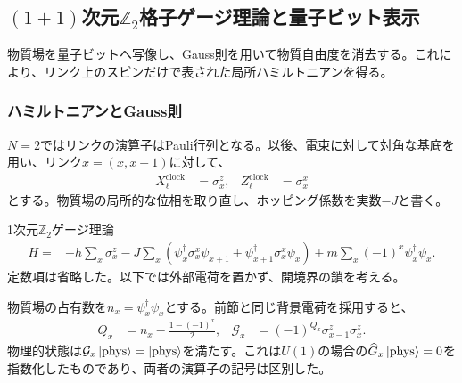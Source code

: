 \documentclass[a4paper,10.5pt]{article}
\numberwithin{equation}{section}
\begin{document}
\subsection{$(1+1)$次元$\mathbb Z_2$格子ゲージ理論と量子ビット表示}
物質場を量子ビットへ写像し、Gauss則を用いて物質自由度を消去する。これにより、リンク上のスピンだけで表された局所ハミルトニアンを得る。

\subsubsection{ハミルトニアンとGauss則}
$N=2$ではリンクの演算子はPauli行列となる。以後、電束に対して対角な基底を用い、リンク$x=(x,x+1)$に対して、
\begin{align}
X_\ell^{\mathrm{clock}}&=\sigma_x^z,&
Z_\ell^{\mathrm{clock}}&=\sigma_x^x
\end{align}
とする。物質場の局所的な位相を取り直し、ホッピング係数を実数$-J$と書く。
\begin{defbox}{1次元$\mathbb Z_2$ゲージ理論}
\begin{align}
H={}&-h\sum_x\sigma_x^z
-J\sum_x\left(\psi_x^\dagger\sigma_x^x\psi_{x+1}
+\psi_{x+1}^\dagger\sigma_x^x\psi_x\right)
+m\sum_x(-1)^x\psi_x^\dagger\psi_x.
\label{eq:z2}
\end{align}
定数項は省略した。以下では外部電荷を置かず、開境界の鎖を考える。
\end{defbox}
物質場の占有数を$n_x=\psi_x^\dagger\psi_x$とする。前節と同じ背景電荷を採用すると、
\begin{align}
Q_x&=n_x-\frac{1-(-1)^x}{2},&
\mathcal G_x&=(-1)^{Q_x}\sigma_{x-1}^z\sigma_x^z.
\end{align}
物理的状態は$\mathcal G_x\ket{\mathrm{phys}}=\ket{\mathrm{phys}}$を満たす。これは$U(1)$の場合の$\widehat G_x\ket{\mathrm{phys}}=0$を指数化したものであり、両者の演算子の記号は区別した。
\end{document}
